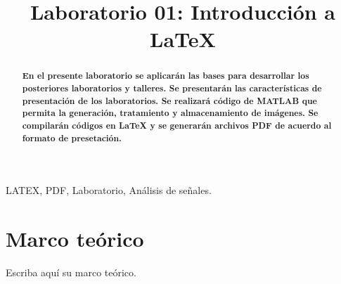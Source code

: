 \documentclass[conference,compsoc,onecolumn]{IEEEtran}
\begin{document}
\title{Laboratorio 01: Introducción a \LaTeX{}}
\author{
}


\maketitle
\IEEEoverridecommandlockouts
\IEEEpeerreviewmaketitle

\begin{abstract}
\textbf{En el presente laboratorio se aplicarán las bases para desarrollar los posteriores laboratorios y talleres. Se presentarán las características de presentación de los laboratorios. Se realizará código de MATLAB que permita la generación, tratamiento y almacenamiento de imágenes. Se compilarán códigos en \LaTeX{} y se generarán archivos
PDF de acuerdo al formato de presetación.}
\end{abstract}


\begin{IEEEkeywords}
    LATEX, PDF, Laboratorio, Análisis de señales.
\end{IEEEkeywords}


\section{Marco teórico}
\label{sec:introduction}
Escriba aquí su marco teórico.
\end{document}
